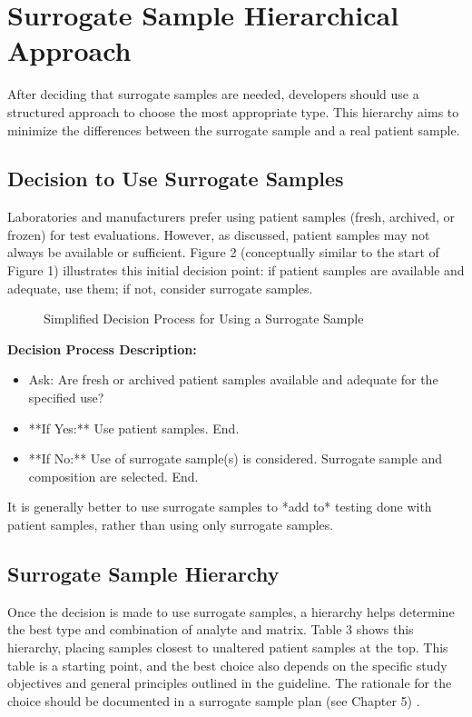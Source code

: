 \documentclass{article}
\begin{document}
\section{Surrogate Sample Hierarchical Approach}

After deciding that surrogate samples are needed, developers should use a structured approach to choose the most appropriate type. This hierarchy aims to minimize the differences between the surrogate sample and a real patient sample.

\subsection{Decision to Use Surrogate Samples}

Laboratories and manufacturers prefer using patient samples (fresh, archived, or frozen) for test evaluations. However, as discussed, patient samples may not always be available or sufficient. Figure 2 (conceptually similar to the start of Figure 1) illustrates this initial decision point: if patient samples are available and adequate, use them; if not, consider surrogate samples.

\begin{figure}[h!]
    \centering
    \caption{Simplified Decision Process for Using a Surrogate Sample \cite{CLSIEP39Ed1E}}
\end{figure}

\textbf{Decision Process Description:}
\begin{itemize}
    \item Ask: Are fresh or archived patient samples available and adequate for the specified use?
    \item **If Yes:** Use patient samples. End.
    \item **If No:** Use of surrogate sample(s) is considered. Surrogate sample and composition are selected. End.
\end{itemize}

It is generally better to use surrogate samples to *add to* testing done with patient samples, rather than using only surrogate samples.

\subsection{Surrogate Sample Hierarchy}

Once the decision is made to use surrogate samples, a hierarchy helps determine the best type and combination of analyte and matrix. Table 3 shows this hierarchy, placing samples closest to unaltered patient samples at the top. This table is a starting point, and the best choice also depends on the specific study objectives and general principles outlined in the guideline. The rationale for the choice should be documented in a surrogate sample plan (see Chapter 5) \cite{CLSIEP39Ed1E}.
\end{document}
